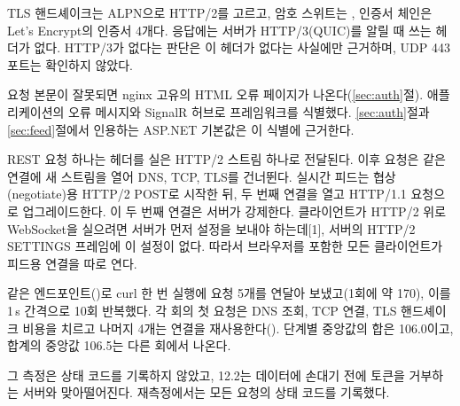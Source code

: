 \seclabel
{}

 TLS 핸드셰이크는 ALPN으로 HTTP/2를 고르고, 암호 스위트는 , 인증서 체인은 Let's Encrypt의 인증서 4개다. 응답에는 서버가 HTTP/3(QUIC)를 알릴 때 쓰는  헤더가 없다. HTTP/3가 없다는 판단은 이 헤더가 없다는 사실에만 근거하며, UDP 443 포트는 확인하지 않았다.

 요청 본문이 잘못되면 nginx 고유의 HTML 오류 페이지가 나온다(\ref{sec:auth}절). 애플리케이션의 오류 메시지와 SignalR 허브로 프레임워크를 식별했다. \ref{sec:auth}절과 \ref{sec:feed}절에서 인용하는 ASP.NET 기본값은 이 식별에 근거한다.

 REST 요청 하나는  헤더를 실은 HTTP/2 스트림 하나로 전달된다. 이후 요청은 같은 연결에 새 스트림을 열어 DNS, TCP, TLS를 건너뛴다. 실시간 피드는 협상(negotiate)용 HTTP/2 POST로 시작한 뒤, 두 번째 연결을 열고 HTTP/1.1  요청으로 업그레이드한다. 이 두 번째 연결은 서버가 강제한다. 클라이언트가 HTTP/2 위로 WebSocket을 실으려면 서버가 먼저  설정을 보내야 하는데[1], 서버의 HTTP/2 SETTINGS 프레임에 이 설정이 없다. 따라서 브라우저를 포함한 모든 클라이언트가 피드용 연결을 따로 연다.



 같은 엔드포인트()로 curl 한 번 실행에 요청 5개를 연달아 보냈고(1회에 약 170\ms), 이를 1\,s 간격으로 10회 반복했다. 각 회의 첫 요청은 DNS 조회, TCP 연결, TLS 핸드셰이크 비용을 치르고 나머지 4개는 연결을 재사용한다(). 단계별 중앙값의 합은 106.0\ms{}이고, 합계의 중앙값 106.5\ms{}는 다른 회에서 나온다.




 그 측정은 상태 코드를 기록하지 않았고, 12.2\ms{}는 데이터에 손대기 전에 토큰을 거부하는 서버와 맞아떨어진다. 재측정에서는 모든 요청의 상태 코드를 기록했다.


